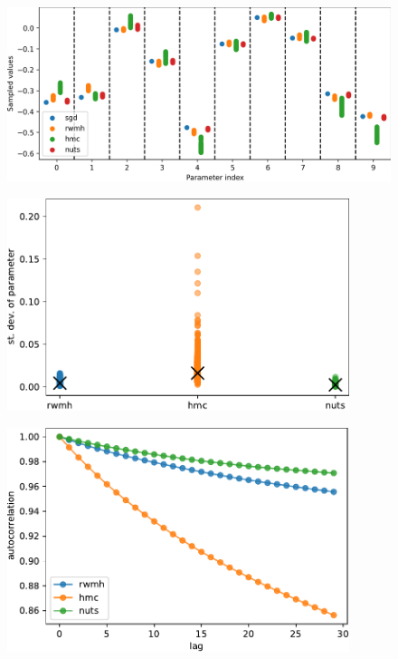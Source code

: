 \documentclass[12pt]{article}
\begin{document}
{\begin{figure}[ht]
\centering
\includegraphics[width=15cm]{plots/uci_param_distribution.png}
\caption{}
\label{fig_uci_param_distribution}
\end{figure}

\begin{figure}[ht]
\centering
\includegraphics[width=10cm]{plots/uci_param_stdev.pdf}
\caption{}
\label{fig_uci_param_stdev}
\end{figure}

\begin{figure}[ht]
\centering
\includegraphics[width=10cm]{plots/uci_param_autocor.pdf}
\caption{}
\label{fig_uci_param_autocor}
\end{figure}

}
\end{document}
